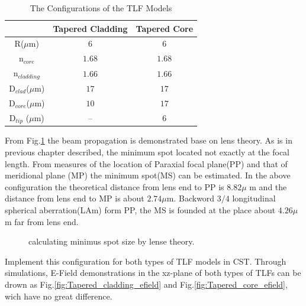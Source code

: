 \begin{table}
\caption{The Configurations of the TLF Models}
\centering
\begin{tabular}{ccc}
\hline
							&Tapered Cladding&Tapered Core\\
\hline
R($\mu$m) & $6$						 &$6$	\\
n$_{core}$&$1.68$&$1.68$\\
n$_{cladding}$&$1.66$&$1.66$\\
D$_{clad}$($\mu$m) &	$17$ &	$17$\\
D$_{core}$($\mu$m) & $10$ &	$17$\\
D$_{tip}$ ($\mu$m) & --   &	$6$\\
\hline
\end{tabular}
\label{tab:model_fiber_configuration}
\end{table}
From Fig.\quad\ref{fig:lens_spot} the beam propagation is demonstrated base on lens theory. As is in previous chapter described, the minimum spot located not exactly at the focal length. From measures of the location of Paraxial focal plane(PP) and that of meridional plane (MP) the minimum spot(MS) can be estimated. In the above configuration the theoretical distance from lens end to PP is $8.82 \mu$ m and the distance from lens end to MP is about $2.74 \mu$m. Backword $3/4$ longitudinal spherical aberration(LAm) form PP, the MS is founded at the place about $4.26 \mu$m far from lens end. 
\begin{figure}
\centering
\label{fig:lens_spot}
\caption{calculating minimus spot size by lense theory.}
\end{figure}
Implement this configuration for both types of TLF models in CST. Through simulations, E-Field demonstrations in the xz-plane of both types of TLFs can be drown as Fig.\quad\ref{fig:Tapered_cladding_efield} and  Fig.\quad\ref{fig:Tapered_core_efield}, wich have no great difference.
